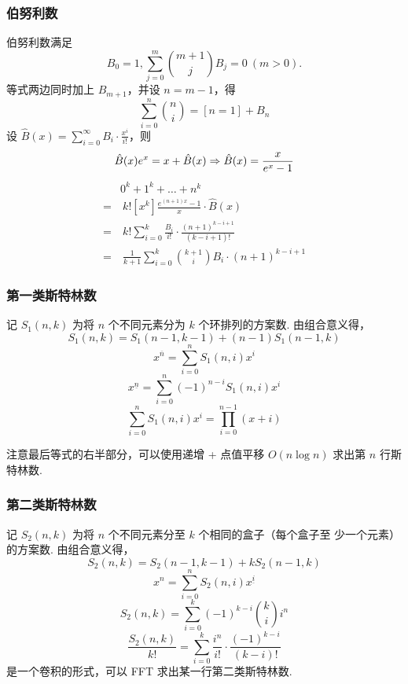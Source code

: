 \subsubsection{伯努利数}
\noindent 伯努利数满足
\begin{equation*}
    B_0 = 1, \sum_{j=0}^m \binom{m+1}{j} B_j = 0 ~ (m > 0).
\end{equation*}
\noindent 等式两边同时加上 $B_{m+1}$，并设 $n = m - 1$，得
\begin{equation*}
\sum_{i=0}^n \binom{n}{i} = [n = 1] + B_n
\end{equation*}
\noindent 设 $\hat{B}(x) = \sum_{i=0}^\infty B_i \cdot \frac{x^i}{i!}$，则
\begin{equation*}
\hat{B}(x) e^x = x + \hat{B}(x) \Rightarrow \hat{B}(x) = \frac{x}{e^x - 1} \\
\end{equation*}
\begin{equation*}
\begin{aligned}
& 0^k + 1^k + \ldots + n^k \\
=& ~ k! [x^k] \frac{e^{(n+1)x}-1}{x} \cdot \hat{B}(x) \\
=& ~ k! \sum_{i=0}^k \frac{B_i}{i!} \cdot \frac{(n+1)^{k-i+1}}{(k-i+1)!} \\
=& ~ \frac{1}{k+1} \sum_{i=0}^k \binom{k+1}{i} B_i \cdot (n+1)^{k-i+1}
\end{aligned}
\end{equation*}

\subsubsection{第一类斯特林数}
\noindent 记 $S_1(n, k)$ 为将 $n$ 个不同元素分为 $k$ 个环排列的方案数. 由组合意义得，
$$
S_1(n, k) = S_1(n - 1, k - 1) + (n - 1) S_1(n - 1, k)
$$
$$
x^{\overline{n}} = \sum_{i=0}^n S_1(n, i) x^i
$$
$$
x^{\underline{n}} = \sum_{i=0}^n (-1)^{n-i} S_1(n, i) x^i
$$
$$
\sum_{i=0}^n S_1(n, i) x^i = \prod_{i=0}^{n-1} (x+i)
$$

\noindent 注意最后等式的右半部分，可以使用递增 + 点值平移 $O(n \log n)$ 求出第
$n$ 行斯特林数.

\subsubsection{第二类斯特林数}
\noindent 记 $S_2(n, k)$ 为将 $n$ 个不同元素分至 $k$ 个相同的盒子（每个盒子至
少一个元素）的方案数. 由组合意义得，
$$
S_2(n, k) = S_2(n - 1, k - 1) + k S_2(n - 1, k)
$$
$$
x^n = \sum_{i=0}^n S_2(n, i) x^{\underline{i}}
$$
$$
S_2(n, k) = \sum_{i=0}^k (-1)^{k-i} \binom{k}{i} i^n
$$
$$
\frac{S_2(n, k)}{k!} = \sum_{i=0}^k \frac{i^n}{i!} \cdot \frac{(-1)^{k-i}}
{(k-i)!}
$$
\noindent 是一个卷积的形式，可以 FFT 求出某一行第二类斯特林数.

